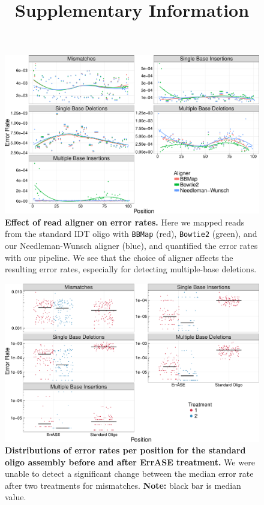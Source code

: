 \documentclass[letterpaper,12pt]{article}
\newcommand{\beginsupplement}{%
        \setcounter{table}{0}
        \renewcommand{\thetable}{S\arabic{table}}%
        \setcounter{figure}{0}
        \renewcommand{\thefigure}{S\arabic{figure}}%
     }
\begin{document}
\beginsupplement

\title{Supplementary Information}
\maketitle

\begin{figure}[!ht]
\centering
\includegraphics[width=174mm]{aligners-1.pdf}
\caption{\small \textbf{Effect of read aligner on error rates.} Here we mapped reads from the standard IDT oligo with \texttt{BBMap} (red), \texttt{Bowtie2} (green), and our Needleman-Wunsch aligner (blue), and quantified the error rates with our pipeline. We see that the choice of aligner affects the resulting error rates, especially for detecting multiple-base deletions.}
\end{figure}

\clearpage
\begin{figure}[t]
\centering
\includegraphics[width=174mm]{nonDoped_vs_ErrASE-1.pdf}
\caption{\small \textbf{Distributions of error rates per position for the standard oligo assembly before and after ErrASE treatment.} We were unable to detect a significant change between the median error rate after two treatments for mismatches. \textbf{Note:} black bar is median value.}
\end{figure}
\end{document}
